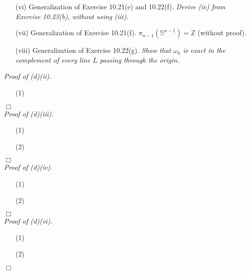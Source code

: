 \documentclass{article}
\begin{document}
\begin{enumerate}
\item[(vi)]
  Generalization of Exercise 10.21(e) and 10.22(f).
  \emph{Derive (iv) from Exercise 10.23(b), without using (iii).}

\item[(vii)]
  Generalization of Exercise 10.21(f).
  $\pi_{n-1}(\mathbb{S}^{n-1}) = \mathbb{Z}$ (without proof).

\item[(viii)]
  Generalization of Exercise 10.22(g).
  \emph{Show that $\omega_k$ is exact in the complement of every line $L$ passing
  through the origin.} \\
\end{enumerate}



\emph{Proof of (d)(ii).}
\begin{enumerate}
\item[(1)]

\end{enumerate}
$\Box$ \\



\emph{Proof of (d)(iii).}
\begin{enumerate}
\item[(1)]

\item[(2)]

\end{enumerate}
$\Box$ \\



\emph{Proof of (d)(iv).}
\begin{enumerate}
\item[(1)]

\item[(2)]

\end{enumerate}
$\Box$ \\



\emph{Proof of (d)(vi).}
\begin{enumerate}
\item[(1)]

\item[(2)]

\end{enumerate}
$\Box$ \\
\end{document}
